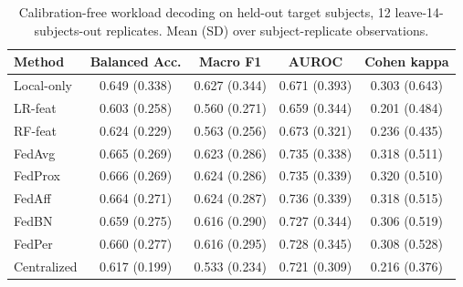 \begin{table}
\caption{Calibration-free workload decoding on held-out target subjects, 12 leave-14-subjects-out replicates. Mean (SD) over subject-replicate observations.}
\label{tab:main}
\begin{tabular}{lcccc}
\toprule
Method & Balanced Acc. & Macro F1 & AUROC & Cohen kappa \\
\midrule
Local-only & 0.649 (0.338) & 0.627 (0.344) & 0.671 (0.393) & 0.303 (0.643) \\
LR-feat & 0.603 (0.258) & 0.560 (0.271) & 0.659 (0.344) & 0.201 (0.484) \\
RF-feat & 0.624 (0.229) & 0.563 (0.256) & 0.673 (0.321) & 0.236 (0.435) \\
FedAvg & 0.665 (0.269) & 0.623 (0.286) & 0.735 (0.338) & 0.318 (0.511) \\
FedProx & 0.666 (0.269) & 0.624 (0.286) & 0.735 (0.339) & 0.320 (0.510) \\
FedAff & 0.664 (0.271) & 0.624 (0.287) & 0.736 (0.339) & 0.318 (0.515) \\
FedBN & 0.659 (0.275) & 0.616 (0.290) & 0.727 (0.344) & 0.306 (0.519) \\
FedPer & 0.660 (0.277) & 0.616 (0.295) & 0.728 (0.345) & 0.308 (0.528) \\
Centralized & 0.617 (0.199) & 0.533 (0.234) & 0.721 (0.309) & 0.216 (0.376) \\
\bottomrule
\end{tabular}
\end{table}
